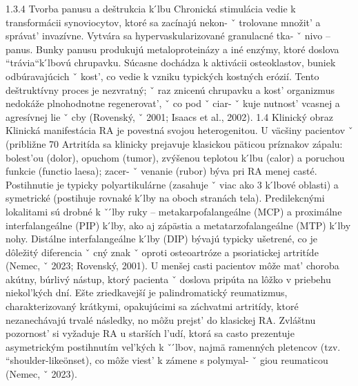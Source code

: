{ 1.3.4 Tvorba panusu a deštrukcia k ́lbu Chronická stimulácia vedie k transformácii synoviocytov, ktoré sa zacínajú nekon- ˇ trolovane množit’ a správat’ invazívne. Vytvára sa hypervaskularizované granulacné tka- ˇ nivo – panus. Bunky panusu produkujú metaloproteinázy a iné enzýmy, ktoré doslova ``trávia``k ́lbovú chrupavku. Súcasne dochádza k aktivácii osteoklastov, buniek odbúravajúcich ˇ kost’, co vedie k vzniku typických kostných erózií. Tento deštruktívny proces je nezvratný; ˇ raz znicenú chrupavku a kost’ organizmus nedokáže plnohodnotne regenerovat’, ˇ co pod ˇ ciar- ˇ kuje nutnost’ vcasnej a agresívnej lie ˇ cby (Rovenský, ˇ 2001; Isaacs et al., 2002).
 1.4 Klinický obraz Klinická manifestácia RA je povestná svojou heterogenitou. U väcšiny pacientov ˇ (približne 70 %
 Artritída sa klinicky prejavuje klasickou päticou príznakov zápalu: bolest’ou (dolor), opuchom (tumor), zvýšenou teplotou k ́lbu (calor) a poruchou funkcie (functio laesa); zacer- ˇ venanie (rubor) býva pri RA menej casté. Postihnutie je typicky polyartikulárne (zasahuje ˇ viac ako 3 k ́lbové oblasti) a symetrické (postihuje rovnaké k ́lby na oboch stranách tela).
 Predilekcnými lokalitami sú drobné k ˇ  ́lby ruky – metakarpofalangeálne (MCP) a proximálne interfalangeálne (PIP) k ́lby, ako aj zápästia a metatarzofalangeálne (MTP) k ́lby nohy. Distálne interfalangeálne k ́lby (DIP) bývajú typicky ušetrené, co je dôležitý diferencia ˇ cný znak ˇ oproti osteoartróze a psoriatickej artritíde (Nemec, ˇ 2023; Rovenský, 2001).
 U menšej casti pacientov môže mat’ choroba akútny, búrlivý nástup, ktorý pacienta ˇ doslova pripúta na lôžko v priebehu niekol’kých dní. Ešte zriedkavejší je palindromatický reumatizmus, charakterizovaný krátkymi, opakujúcimi sa záchvatmi artritídy, ktoré nezanechávajú trvalé následky, no môžu prejst’ do klasickej RA. Zvláštnu pozornost’ si vyžaduje RA u starších l’udí, ktorá sa casto prezentuje asymetrickým postihnutím vel’kých k ˇ  ́lbov, najmä ramenných pletencov (tzv. ``shoulder-likeönset), co môže viest’ k zámene s polymyal- ˇ giou reumaticou (Nemec, ˇ 2023).
}
